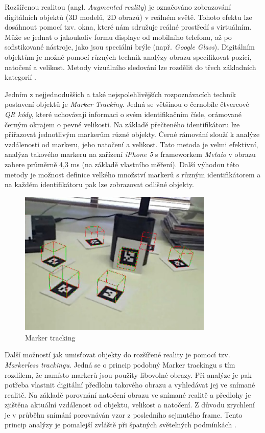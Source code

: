 \documentclass[twoside,12pt]{article}
\begin{document}
%
%

Rozšířenou realitou (angl. \textit{Augmented reality}) je označováno zobrazování digitálních objektů (3D modelů, 2D obrazů) v reálném světě. Tohoto efektu lze dosáhnout pomocí tzv. okna, které nám sdružuje reálné prostředí s virtuálním. Může se jednat o jakoukoliv formu displaye od mobilního telefonu, až po sofistikované nástroje, jako jsou speciální brýle (např. \textit{Google Glass}). Digitálním objektům je možné pomocí různých technik analýzy obrazu specifikovat pozici, natočení a velikost. Metody vizuálního sledování lze rozdělit do třech základních kategorií \cite{klein_visual_tracking}.

Jedním z nejjednodušších a také nejspolehlivějších rozpoznávacích technik postavení objektů je \textit{Marker Tracking}. Jedná se většinou o černobíle čtvercové \textit{QR kódy}, které uchovávají informaci o svém identifikačním čísle, orámované černým okrajem o pevné velikosti. Na základě přečteného identifikátoru lze přiřazovat jednotlivým markerům různé objekty. Černé rámování slouží k analýze vzdálenosti od markeru, jeho natočení a velikost. Tato metoda je velmi efektivní, analýza takového markeru na zařízení \textit{iPhone 5} s frameworkem \textit{Metaio} v obrazu zabere průměrně 4,3 ms (na základě vlastního měření). Další výhodou této metody je možnost definice velkého množství markerů s různým identifikátorem a na každém identifikátoru pak lze zobrazovat odlišné objekty.

\begin{figure}[H]
    \includegraphics[width=350px, center]{images/marker-tracking.jpg}
    \caption{Marker tracking}
    \label{marker_tracking}
\end{figure}

Další možností jak umisťovat objekty do rozšířené reality je pomocí tzv. \textit{Markerless trackingu}. Jedná se o princip podobný Marker trackingu s tím rozdílem, že namísto markerů jsou použity libovolné obrazy. Při analýze je pak potřeba vlastnit digitální předlohu takového obrazu a vyhledávat jej ve snímané realitě. Na základě porovnání natočení obrazu ve snímané realitě a předlohy je zjištěna aktuální vzdálenost od objektu, velikost a natočení. Z důvodu zrychlení je v průběhu snímání porovnáván vzor z posledního sejmutého frame. Tento princip analýzy je pomalejší zvláště při špatných světelných podmínkách \cite{handbook_of_ar}.
\end{document}
